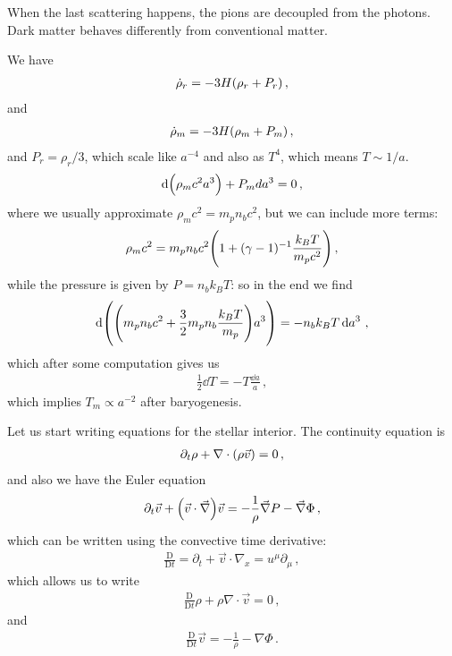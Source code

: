 \documentclass[main.tex]{subfiles}
\begin{document}
When the last scattering happens, the pions are decoupled from the photons. Dark matter behaves differently from conventional matter. 

We have 
%
\begin{align}
  \dot{\rho}_r = - 3H \qty(\rho _r + P_r)
\,,
\end{align}
%
and 
%
\begin{align}
  \dot{\rho}_m = -3H \qty(\rho _m + P_m )
\,,
\end{align}
%
and \(P_r = \rho_r / 3\), which scale like \(a^{-4} \) and also as \(T^{4}\), which means \(T \sim 1/a\).  
%
\begin{align}
  \dd \qty(\rho _m c^2 a^3) + P_m d a^3 = 0
\,,
\end{align}
%
where we usually approximate \(\rho _m c^2 = m_p n_b c^2\), but we can include more terms: 
%
\begin{align}
  \rho _m c^2 = m_p n_b c^2 \qty(1 + (\gamma -1 )^{-1} \frac{k_B T}{m_p c^2})
\,,
\end{align}
%
while the pressure is given by \(P = n_b k_B T\): so in the end we find 
%
\begin{align}
  \dd \qty(\qty(m_p n_b c^2 + \frac{3}{2} m_p n_b \frac{k_BT}{m_p})a^3) = - n_b k_B T \dd{a^3}
\,,
\end{align}
%
which after some computation gives us 
%
\begin{align}
  \frac{1}{2} \dd{T } = - T \frac{ \dd{a}}{a}
\,,
\end{align}
%
which implies \(T_m \propto a^{-2}\) after baryogenesis. 


Let us start writing equations for the stellar interior. The continuity equation is 
%
\begin{align}
  \partial_{t} \rho + \nabla \cdot \qty(\rho \vec{v}) = 0
\,,
\end{align}
%
and also we have the Euler equation 
%
\begin{align}
  \partial_{t} \vec{v} + \qty(\vec{v} \cdot \vec{\nabla}) \vec{v}
  = - \frac{1}{\rho } \vec{\nabla} P - \vec{\nabla} \Phi 
\,,
\end{align}
%
which can be written using the convective time derivative: 
%
\begin{align}
  \frac{ \mathrm{D} }{\mathrm{D}t} = \partial_{t} + \vec{v} \cdot \nabla_{x} = u^{\mu } \partial_{\mu }
\,,
\end{align}
%
which allows us to write 
%
\begin{align}
  \frac{ \mathrm{D} }{\mathrm{D}t} \rho + \rho \nabla \cdot \vec{v} = 0
\,,
\end{align}
%
and 
%
\begin{align}
  \frac{ \mathrm{D} }{\mathrm{D}t} \vec{v} 
  = - \frac{1}{\rho } - \nabla \Phi 
\,.
\end{align}
\end{document}
